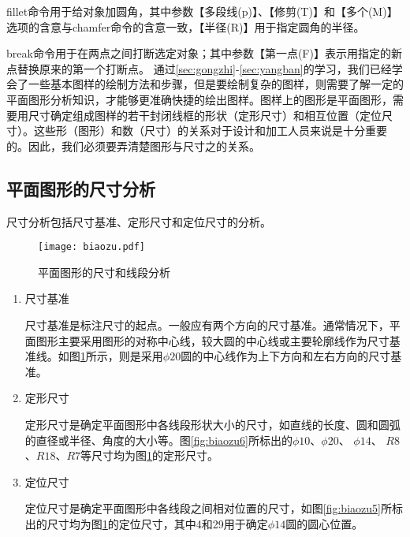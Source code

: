fillet命令用于给对象加圆角，其中参数【多段线(p)】、【修剪(T)】和【多个(M)】选项的含意与chamfer命令的含意一致，【半径(R)】用于指定圆角的半径。

break命令用于在两点之间打断选定对象；其中参数【第一点(F)】表示用指定的新点替换原来的第一个打断点。
通过\ref{sec:gongzhi}-\ref{sec:yangban}的学习，我们已经学会了一些基本图样的绘制方法和步骤，但是要绘制复杂的图样，则需要了解一定的平面图形分析知识，才能够更准确快捷的绘出图样。图样上的图形是平面图形，需要用尺寸确定组成图样的若干封闭线框的形状（定形尺寸）和相互位置（定位尺寸）。这些形（图形）和数（尺寸）的关系对于设计和加工人员来说是十分重要的。因此，我们必须要弄清楚图形与尺寸之的关系。

\subsection{平面图形的尺寸分析}
尺寸分析包括尺寸基准、定形尺寸和定位尺寸的分析。


\noindent
\begin{figure}[htbp]
\centering
\texttt{[image: biaozu.pdf]}
\caption{平面图形的尺寸和线段分析} \label{fig:biaozu}
\end{figure}
\indent

\begin{enumerate}
\item 尺寸基准

尺寸基准是标注尺寸的起点。一般应有两个方向的尺寸基准。通常情况下，平面图形主要采用图形的对称中心线，较大圆的中心线或主要轮廓线作为尺寸基准线。如图\ref{fig:biaozu}所示，则是采用$\phi 20$圆的中心线作为上下方向和左右方向的尺寸基准。

\item 定形尺寸

定形尺寸是确定平面图形中各线段形状大小的尺寸，如直线的长度、圆和圆弧的直径或半径、角度的大小等。图\ref{fig:biaozu6}所标出的$\phi 10$、$\phi 20$、 $\phi 14$、 $R8$、$R18$、$R7$等尺寸均为图\ref{fig:biaozu}的定形尺寸。

\noindent
\begin{figure}[htbp]
\centering
\begin{floatrow}
\end{floatrow}
\end{figure}
\indent

\item 定位尺寸

定位尺寸是确定平面图形中各线段之间相对位置的尺寸，如图\ref{fig:biaozu5}所标出的尺寸均为图\ref{fig:biaozu}的定位尺寸，其中4和29用于确定$\phi 14$圆的圆心位置。

\end{enumerate}
